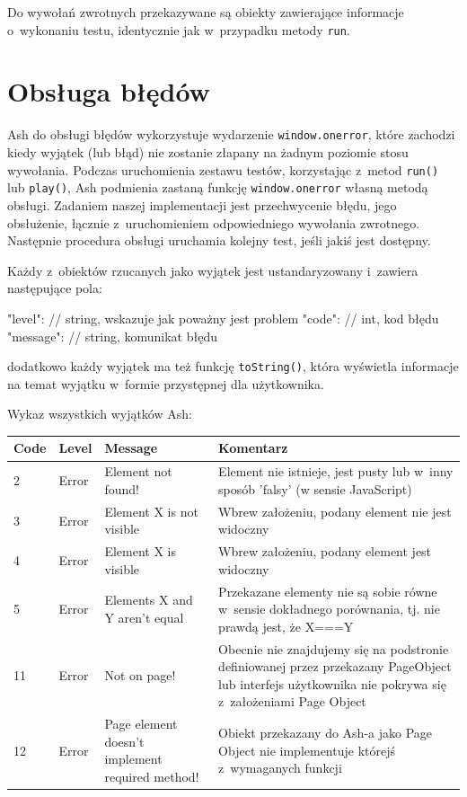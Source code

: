 \documentclass[brudnopis]{xmgr}
\begin{document}
Do wywołań zwrotnych przekazywane są obiekty zawierające informacje o~wykonaniu testu, identycznie jak w~przypadku metody \texttt{run}.

\section{Obsługa błędów}

Ash do obsługi błędów wykorzystuje wydarzenie \texttt{window.onerror}, które zachodzi kiedy wyjątek (lub błąd) nie zostanie złapany na żadnym poziomie stosu wywołania. Podczas uruchomienia zestawu testów, korzystając z~metod \texttt{run()} lub \texttt{play()}, Ash podmienia zastaną funkcję \texttt{window.onerror} własną metodą obsługi. Zadaniem naszej implementacji jest przechwycenie błędu, jego obsłużenie, łącznie z~uruchomieniem odpowiedniego wywołania zwrotnego. Następnie procedura obsługi uruchamia kolejny test, jeśli jakiś jest dostępny. 

Każdy z~obiektów rzucanych jako wyjątek jest ustandaryzowany i~zawiera następujące pola: 

\begin{javascriptcode}
	{
		"level": // string, wskazuje jak poważny jest problem 
		"code": // int, kod błędu 
		"message": // string, komunikat błędu 
	}
\end{javascriptcode}

dodatkowo każdy wyjątek ma też funkcję \texttt{toString()}, która wyświetla informacje na temat wyjątku w~formie przystępnej dla użytkownika.

Wykaz wszystkich wyjątków Ash:

\begin{center}
    \begin{tabularx}{\textwidth}{ | p{1cm} | p{2cm} | X | X |}
    \hline
    Code & Level & Message & Komentarz \\ \hline
    2 & Error & Element not found! & Element nie istnieje, jest pusty lub w~inny sposób 'falsy' (w sensie JavaScript)  \\ \hline
    3 & Error & Element X is not visible & Wbrew założeniu, podany element nie jest widoczny  \\ \hline
    4 & Error & Element X is visible & Wbrew założeniu, podany element jest widoczny  \\ \hline
    5 & Error & Elements X and Y aren't equal & Przekazane elementy nie są sobie równe w~sensie dokładnego porównania, tj.  nie prawdą jest, że X===Y  \\ \hline
    11 & Error & Not on page! & Obecnie nie znajdujemy się na podstronie definiowanej przez przekazany PageObject lub interfejs użytkownika nie pokrywa się z~założeniami Page Object  \\ \hline
    12 & Error & Page element doesn't implement required method! & Obiekt przekazany do Ash-a jako Page Object nie implementuje którejś z~wymaganych funkcji  \\ \hline
    \end{tabularx}
\end{center}
\end{document}
